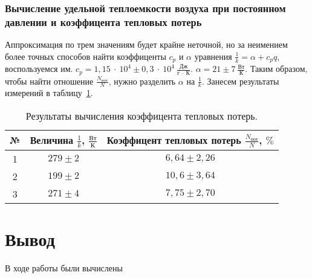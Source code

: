 \documentclass[a4paper,11pt]{article}
\begin{document}
\subsubsection{Вычисление удельной теплоемкости воздуха при постоянном давлении и коэффицента тепловых потерь}
Аппроксимация по трем значениям будет крайне неточной, но за неимением более точных способов найти коэффиценты $c_{p}$ и $\alpha$ уравнения $\frac{1}{k} = \alpha + c_{p}q$, воспользуемся им.\newline
$c_{p} = 1,15\ \cdot\ 10^{4} \pm 0,3\ \cdot\ 10^{4}\ \frac{Дж}{г\ \cdot\ К}$.\newline\newline
$\alpha = 21 \pm 7\ \frac{Вт}{К}$.\newline\newline
Таким образом, чтобы найти отношение $\frac{N_{пот}}{N}$, нужно разделить $\alpha$ на $\frac{1}{k}$. Занесем результаты измерений в таблицу~\ref{table:tab8}.
\begin{table}[h!]
\centering
\begin{tabular}{ ||c|c|c|| }
  \hline
  № & Величина $\frac{1}{k}$, $\frac{Вт}{К}$ & Коэффицент тепловых потерь $\frac{N_{пот}}{N}$, $\%$ \\
  \hline
  1 & $279 \pm 2$ & $6,64 \pm 2,26$ \\
  2 & $199 \pm 2$ & $10,6 \pm 3,64$ \\
  3 & $271 \pm 4$ & $7,75 \pm 2,70$ \\
  \hline
\end{tabular}
\caption{Результаты вычисления коэффицента тепловых потерь.}
\label{table:tab8}
\end{table}
\section{Вывод}
В ходе работы были вычислены
\end{document}
